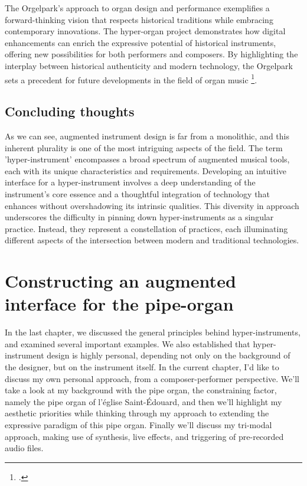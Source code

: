 \documentclass[12pt,twoside,maitrise]{dms_ks}
\theoremstyle{definition}
\begin{document}
{The Orgelpark's approach to organ design and performance exemplifies a forward-thinking vision that respects historical traditions while embracing contemporary innovations. 
The hyper-organ project demonstrates how digital enhancements can enrich the expressive potential of historical instruments, offering new possibilities for both performers and composers. 
By highlighting the interplay between historical authenticity and modern technology, the Orgelpark sets a precedent for future developments in the field of organ music \footcite[69]{fales_fusion_1994}.

\section{Concluding thoughts}

As we can see, augmented instrument design is far from a monolithic, and this inherent plurality is one of the most intriguing aspects of the field.
The term 'hyper-instrument' encompasses a broad spectrum of augmented musical tools, each with its unique characteristics and requirements.
Developing an intuitive interface for a hyper-instrument involves a deep understanding of the instrument's core essence and a thoughtful integration of technology that enhances without overshadowing its intrinsic qualities.
This diversity in approach underscores the difficulty in pinning down hyper-instruments as a singular practice.
Instead, they represent a constellation of practices, each illuminating different aspects of the intersection between modern and traditional technologies.

\chapter{Constructing an augmented interface for the pipe-organ}

In the last chapter, we discussed the general principles behind hyper-instruments, and examined several important examples. 
We also established that hyper-instrument design is highly personal, depending not only on the background of the designer, but on the instrument itself. 
In the current chapter, I'd like to discuss my own personal approach, from a composer-performer perspective. We'll take a look at my background with the pipe organ, the constraining factor, namely the pipe organ of l'église Saint-Édouard, and then we'll highlight my aesthetic priorities while thinking through my approach to extending the expressive paradigm of this pipe organ. Finally we'll discuss my tri-modal approach, making use of synthesis, live effects, and triggering of pre-recorded audio files. 

}
\end{document}
